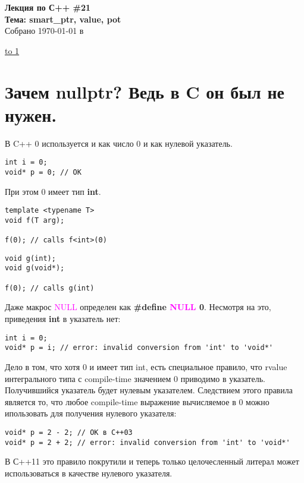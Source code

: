 \documentclass[12pt]{article}
\begin{document}
    \begin{center}

    {\Large \bf Лекция по С++ \#21} \\
    \vspace{0.5em}
    {\Large \bf Тема: smart\_ptr, value, pot} \\
    \vspace{0.5em}
    {\large Собрано {\today} в {\currenttime}}


    \end{center}
\underline{\hbox to 1\textwidth{{ } \hfil{ } \hfil{ } }}

\tableofcontents

\newpage
\section{Зачем nullptr? Ведь в C он был не нужен.}
В C++ 0 используется и как число 0 и как нулевой указатель. 
\begin{verbatim}
int i = 0;
void* p = 0; // OK
\end{verbatim}
При этом 0 имеет тип {\bf int}.
\begin{verbatim}
template <typename T>
void f(T arg);

f(0); // calls f<int>(0)
\end{verbatim}
\begin{verbatim}
void g(int);
void g(void*);

f(0); // calls g(int)
\end{verbatim}

Даже макрос \textcolor{magenta}{NULL} определен как {\bf \#define \textcolor{magenta}{NULL} 0}.
Несмотря на это, приведения {\bf int} в указатель нет:
\begin{verbatim}
int i = 0;
void* p = i; // error: invalid conversion from 'int' to 'void*'
\end{verbatim}
Дело в том, что хотя 0 и имеет тип int, есть специальное правило, что rvalue интегрального типа с compile-time значением 0 приводимо в указатель. Получившийся указатель будет нулевым указателем. Следствием этого правила является то, что любое compile-time выражение вычисляемое в 0 можно ипользовать для получения нулевого указателя:
\begin{verbatim}
void* p = 2 - 2; // OK в C++03
void* p = 2 + 2; // error: invalid conversion from 'int' to 'void*'
\end{verbatim}
В С++11 это правило покрутили и теперь только целочесленный литерал может использоваться в качестве нулевого указателя.
\end{document}
